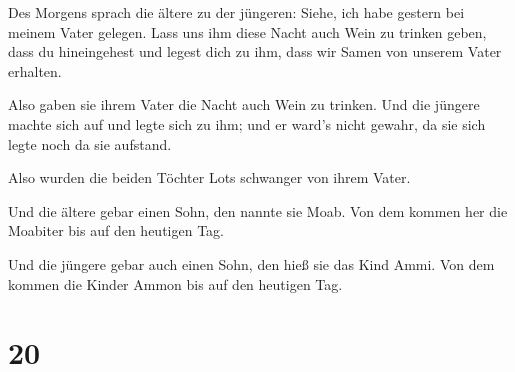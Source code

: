  Des Morgens sprach die ältere zu der jüngeren: Siehe,
ich habe gestern bei meinem Vater gelegen. Lass uns ihm diese Nacht auch
Wein zu trinken geben, dass du hineingehest und legest dich zu ihm, dass
wir Samen von unserem Vater erhalten.

 Also gaben sie ihrem Vater die Nacht auch Wein zu
trinken. Und die jüngere machte sich auf und legte sich zu ihm; und er
ward's nicht gewahr, da sie sich legte noch da sie aufstand.

 Also wurden die beiden Töchter Lots schwanger von ihrem
Vater.

 Und die ältere gebar einen Sohn, den nannte sie Moab.
Von dem kommen her die Moabiter bis auf den heutigen Tag.

 Und die jüngere gebar auch einen Sohn, den hieß sie das
Kind Ammi. Von dem kommen die Kinder Ammon bis auf den heutigen Tag.

\hypertarget{section-19}{%
\section{20}\label{section-19}}

